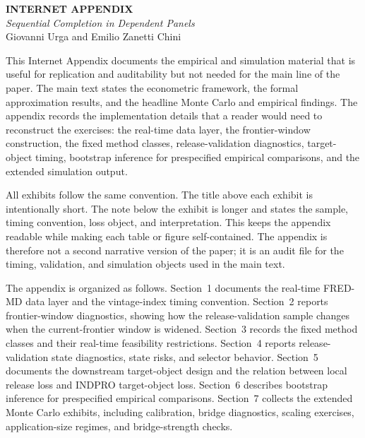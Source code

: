\documentclass[a4paper,12pt]{article}
\newcommand{\1}{\mathbf{1}}
\begin{document}
\onehalfspacing

\renewcommand{\thetable}{IA.\arabic{table}}
\renewcommand{\thefigure}{IA.\arabic{figure}}
\renewcommand{\thealgorithm}{IA.\arabic{algorithm}}
\newtheorem{iaassumption}{Assumption}
\renewcommand{\theiaassumption}{IA.\arabic{iaassumption}}
\newtheorem{iaproposition}{Proposition}
\renewcommand{\theiaproposition}{IA.\arabic{iaproposition}}
\setcounter{table}{0}
\setcounter{figure}{0}
\setcounter{algorithm}{0}

\begin{center}
{\Large \textbf{INTERNET APPENDIX}}\\[0.5em]
{\large \textit{Sequential Completion in Dependent Panels}}\\[0.5em]
Giovanni Urga and Emilio Zanetti Chini
\end{center}


This Internet Appendix documents the empirical and simulation material that is useful for replication and auditability but not needed for the main line of the paper. The main text states the econometric framework, the formal approximation results, and the headline Monte Carlo and empirical findings. The appendix records the implementation details that a reader would need to reconstruct the exercises: the real-time data layer, the frontier-window construction, the fixed method classes, release-validation diagnostics, target-object timing, bootstrap inference for prespecified empirical comparisons, and the extended simulation output.

All exhibits follow the same convention. The title above each exhibit is intentionally short. The note below the exhibit is longer and states the sample, timing convention, loss object, and interpretation. This keeps the appendix readable while making each table or figure self-contained. The appendix is therefore not a second narrative version of the paper; it is an audit file for the timing, validation, and simulation objects used in the main text.

The appendix is organized as follows. Section~1 documents the real-time FRED-MD data layer and the vintage-index timing convention. Section~2 reports frontier-window diagnostics, showing how the release-validation sample changes when the current-frontier window is widened. Section~3 records the fixed method classes and their real-time feasibility restrictions. Section~4 reports release-validation state diagnostics, state risks, and selector behavior. Section~5 documents the downstream target-object design and the relation between local release loss and INDPRO target-object loss. Section~6 describes bootstrap inference for prespecified empirical comparisons. Section~7 collects the extended Monte Carlo exhibits, including calibration, bridge diagnostics, scaling exercises, application-size regimes, and bridge-strength checks.
\end{document}
